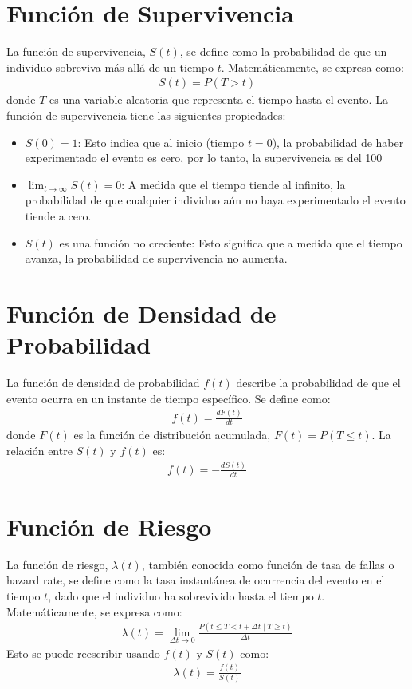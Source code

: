 \documentclass[a4paper]{report} %
\begin{document}
\section{Funci\'on de Supervivencia}
La funci\'on de supervivencia, $S(t)$, se define como la probabilidad de que un individuo sobreviva más allá de un tiempo $t$. Matemáticamente, se expresa como:
\begin{eqnarray*}
S(t) = P(T > t)
\end{eqnarray*}
donde $T$ es una variable aleatoria que representa el tiempo hasta el evento. La funci\'on de supervivencia tiene las siguientes propiedades:
\begin{itemize}
    \item $S(0) = 1$: Esto indica que al inicio (tiempo $t=0$), la probabilidad de haber experimentado el evento es cero, por lo tanto, la supervivencia es del 100%
    \item $\lim_{t \to \infty} S(t) = 0$: A medida que el tiempo tiende al infinito, la probabilidad de que cualquier individuo a\'un no haya experimentado el evento tiende a cero.
    \item $S(t)$ es una funci\'on no creciente: Esto significa que a medida que el tiempo avanza, la probabilidad de supervivencia no aumenta.
\end{itemize}

\section{Funci\'on de Densidad de Probabilidad}
La funci\'on de densidad de probabilidad $f(t)$ describe la probabilidad de que el evento ocurra en un instante de tiempo espec\'ifico. Se define como:
\begin{eqnarray*}
f(t) = \frac{dF(t)}{dt}
\end{eqnarray*}
donde $F(t)$ es la funci\'on de distribuci\'on acumulada, $F(t) = P(T \leq t)$. La relaci\'on entre $S(t)$ y $f(t)$ es:
\begin{eqnarray*}
f(t) = -\frac{dS(t)}{dt}
\end{eqnarray*}

\section{Funci\'on de Riesgo}
La funci\'on de riesgo, $\lambda(t)$, tambi\'en conocida como funci\'on de tasa de fallas o hazard rate, se define como la tasa instant\'anea de ocurrencia del evento en el tiempo $t$, dado que el individuo ha sobrevivido hasta el tiempo $t$. Matem\'aticamente, se expresa como:
\begin{eqnarray*}
\lambda(t) = \lim_{\Delta t \to 0} \frac{P(t \leq T < t + \Delta t \mid T \geq t)}{\Delta t}
\end{eqnarray*}
Esto se puede reescribir usando $f(t)$ y $S(t)$ como:
\begin{eqnarray*}
\lambda(t) = \frac{f(t)}{S(t)}
\end{eqnarray*}
\end{document}
